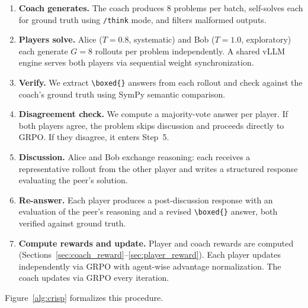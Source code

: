 \documentclass{article}
\begin{document}
\begin{enumerate}[leftmargin=*,itemsep=1pt]
    \item \textbf{Coach generates.} The coach produces 8 problems per batch, self-solves each for ground truth using \texttt{/think} mode, and filters malformed outputs.
    \item \textbf{Players solve.} Alice ($T\!=\!0.8$, systematic) and Bob ($T\!=\!1.0$, exploratory) each generate $G\!=\!8$ rollouts per problem independently. A shared vLLM engine serves both players via sequential weight synchronization.
    \item \textbf{Verify.} We extract \texttt{\textbackslash boxed\{\}} answers from each rollout and check against the coach's ground truth using SymPy semantic comparison.
    \item \textbf{Disagreement check.} We compute a majority-vote answer per player. If both players agree, the problem skips discussion and proceeds directly to GRPO. If they disagree, it enters Step~5.
    \item \textbf{Discussion.} Alice and Bob exchange reasoning: each receives a representative rollout from the other player and writes a structured response evaluating the peer's solution.
    \item \textbf{Re-answer.} Each player produces a post-discussion response with an evaluation of the peer's reasoning and a revised \texttt{\textbackslash boxed\{\}} answer, both verified against ground truth.
    \item \textbf{Compute rewards and update.} Player and coach rewards are computed (Sections~\ref{sec:coach_reward}--\ref{sec:player_reward}). Each player updates independently via GRPO with agent-wise advantage normalization. The coach updates via GRPO every iteration.
\end{enumerate}

Figure~\ref{alg:crisp} formalizes this procedure.
\end{document}
